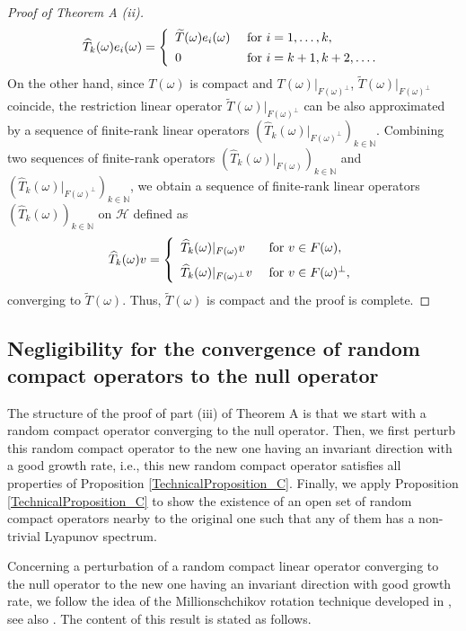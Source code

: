 \documentclass[pdflatex,sn-mathphys-num]{sn-jnl}%
\theoremstyle{thmstyleone}%
\theoremstyle{thmstyletwo}%
\theoremstyle{thmstylethree}%
\newcommand{\N}{\mathbb{N}}
\numberwithin{equation}{section}
\begin{document}
\begin{proof}[Proof of Theorem A (ii)]
\[
\widehat T_k(\omega)e_i(\omega)
=\left\{
\begin{array}{ll}
\widetilde T(\omega)e_i(\omega)     & \hbox{ for } i=1,\dots,k, \\[1ex]
0     & \hbox{ for } i=k+1,k+2,\dots. 
\end{array}
\right.
\]
On the other hand, since $T(\omega)$ is compact and $T(\omega)|_{F(\omega)^{\perp}}$, $\widetilde T(\omega)|_{F(\omega)^{\perp}}$ coincide, the restriction linear operator $\widetilde T(\omega)|_{F(\omega)^{\perp}}$ can be also approximated by a sequence of finite-rank linear operators $\left(\widehat T_k(\omega)|_{F(\omega)^{\perp}}\right)_{k\in\N}$. Combining two sequences of finite-rank operators $\left(\widehat T_k(\omega)|_{F(\omega)}\right)_{k\in\N}$  and $\left(\widehat T_k(\omega)|_{F(\omega)^{\perp}}\right)_{k\in\N}$, we obtain a sequence of finite-rank linear  operators $(\widehat T_k(\omega))_{k\in \N}$ on $\mathcal H$ defined as 
\[
\widehat T_k(\omega)v
=
\left\{
\begin{array}{ll}
\widehat T_k(\omega)|_{F(\omega)} v     & \hbox{ for } v\in F(\omega),\\[1.5ex]
\widehat T_k(\omega)|_{F(\omega)^{\perp}} v     & \hbox{ for } v\in F(\omega)^{\perp},
\end{array}
\right.
\]
converging to $\widetilde T(\omega)$. Thus, $\widetilde T(\omega)$ is compact and the proof is complete.
\end{proof}
%
%
\subsection{Negligibility for the convergence of random compact operators to the null operator}
%
The structure of the proof of part (iii) of Theorem A  is that we start with a random  compact operator converging to the null operator. Then, we first perturb this random compact operator to the new one having an invariant direction with a good growth rate, i.e., this new random compact operator satisfies all properties of Proposition \ref{TechnicalProposition_C}. Finally, we apply Proposition \ref{TechnicalProposition_C} to show the existence of an open set of random compact operators nearby to the original one such that any of them has a non-trivial Lyapunov spectrum. 

Concerning a perturbation of a random compact linear operator converging to the null operator to the new one having an invariant direction with good growth rate, we follow the idea of the Millionschchikov rotation technique developed in \cite[Theorem 3.6]{Cong05}, see also \cite{Avila09}. The content of this result is stated as follows.
%
%
%
%
\end{document}
